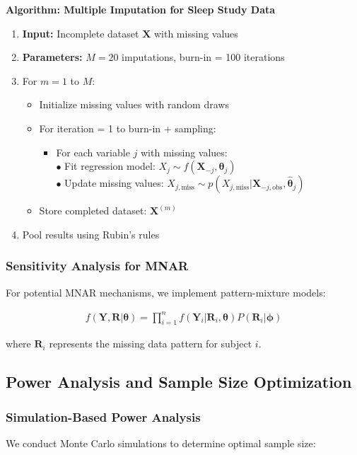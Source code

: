 \documentclass[11pt]{article}
\begin{document}
\textbf{Algorithm: Multiple Imputation for Sleep Study Data}

\begin{enumerate}
\item \textbf{Input:} Incomplete dataset $\mathbf{X}$ with missing values
\item \textbf{Parameters:} $M = 20$ imputations, burn-in = 100 iterations
\item For $m = 1$ to $M$:
    \begin{itemize}
    \item Initialize missing values with random draws
    \item For iteration = 1 to burn-in + sampling:
        \begin{itemize}
        \item For each variable $j$ with missing values: \\
            \quad $\bullet$ Fit regression model: $X_j \sim f(\mathbf{X}_{-j}, \boldsymbol{\theta}_j)$ \\
            \quad $\bullet$ Update missing values: $X_{j,\text{miss}} \sim p(X_{j,\text{miss}} | \mathbf{X}_{-j,\text{obs}}, \hat{\boldsymbol{\theta}}_j)$
        \end{itemize}
    \item Store completed dataset: $\mathbf{X}^{(m)}$
    \end{itemize}
\item Pool results using Rubin's rules
\end{enumerate}

\subsubsection{Sensitivity Analysis for MNAR}
For potential MNAR mechanisms, we implement pattern-mixture models:

\begin{align}
f(\mathbf{Y}, \mathbf{R} | \boldsymbol{\theta}) = \prod_{i=1}^n f(\mathbf{Y}_i | \mathbf{R}_i, \boldsymbol{\theta}) P(\mathbf{R}_i | \boldsymbol{\phi})
\end{align}

where $\mathbf{R}_i$ represents the missing data pattern for subject $i$.

\subsection{Power Analysis and Sample Size Optimization}

\subsubsection{Simulation-Based Power Analysis}
We conduct Monte Carlo simulations to determine optimal sample size:
\end{document}
